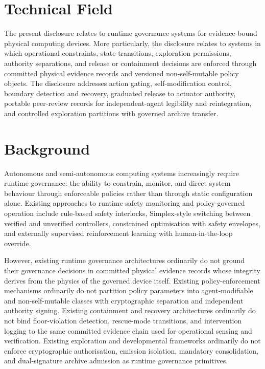 \documentclass[a4paper,12pt]{article}
\begin{document}
\section{Technical Field}

The present disclosure relates to runtime governance systems for
evidence-bound physical computing devices. More particularly, the
disclosure relates to systems in which operational constraints, state
transitions, exploration permissions, authority separations, and
release or containment decisions are enforced through committed
physical evidence records and versioned non-self-mutable policy
objects. The disclosure addresses action gating, self-modification
control, boundary detection and recovery, graduated release to
actuator authority, portable peer-review records for independent-agent
legibility and reintegration, and controlled exploration partitions
with governed archive transfer.

\section{Background}

Autonomous and semi-autonomous computing systems increasingly require
runtime governance: the ability to constrain, monitor, and direct
system behaviour through enforceable policies rather than through
static configuration alone. Existing approaches to runtime safety
monitoring and policy-governed operation include rule-based safety
interlocks, Simplex-style switching between verified and unverified
controllers, constrained optimisation with safety envelopes, and
externally supervised reinforcement learning with human-in-the-loop
override.

However, existing runtime governance architectures ordinarily do not
ground their governance decisions in committed physical evidence
records whose integrity derives from the physics of the governed
device itself. Existing policy-enforcement mechanisms ordinarily do
not partition policy parameters into agent-modifiable and
non-self-mutable classes with cryptographic separation and independent
authority signing. Existing containment and recovery architectures
ordinarily do not bind floor-violation detection, rescue-mode
transitions, and intervention logging to the same committed evidence
chain used for operational sensing and verification. Existing
exploration and developmental frameworks ordinarily do not enforce
cryptographic authorisation, emission isolation, mandatory
consolidation, and dual-signature archive admission as runtime
governance primitives.
\end{document}

